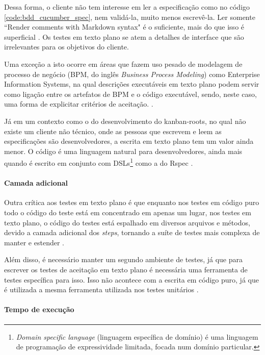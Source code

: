 Dessa forma, o cliente não tem interesse em ler a especificação como no código \ref{code:bdd_cucumber_spec}, nem validá-la, muito menos escrevê-la. Ler somente ``Render comments with Markdown syntax" é o suficiente, mais do que isso é superficial \cite{WhyBotherWithCucumberTesting}. Os testes em texto plano se atem a detalhes de interface que são irrelevantes para os objetivos do cliente.

Uma exceção a isto ocorre em áreas que fazem uso pesado de modelagem de processo de negócio (BPM, do inglês \textit{Business Process Modeling})  como Enterprise Information Systems, na qual descrições executáveis em texto plano podem servir como ligação entre os artefatos de BPM e o código executável, sendo, neste caso, uma forma de explicitar critérios de aceitação. \cite{IntroducingBLDD}.

Já em um contexto como o do desenvolvimento do kanban-roots, no qual não existe um cliente não técnico, onde as pessoas que escrevem e leem as especificações são desenvolvedores, a escrita em texto plano tem um valor ainda menor. O código é uma linguagem natural para desenvolvedores, ainda mais quando é escrito em conjunto com DSLs\footnote{\textit{Domain specific language} (linguagem específica de domínio) é uma linguagem de programação de expressividade limitada, focada num domínio particular.}  como a do Rspec \cite{SteakOverCucumber}.


\paragraph{Camada adicional}
\label{sssub:camada_adicional}

Outra crítica aos testes em texto plano é que enquanto nos testes em código puro todo o código do teste está em concentrado em apenas um lugar, nos testes em texto plano, o código do testes está espalhado em diversos arquivos e métodos, devido a camada adicional dos \textit{steps}, tornando a suíte de testes mais complexa de manter e estender \cite{SteakOverCucumber}.

Além disso, é necessário manter um segundo ambiente de testes, já que para escrever os testes de aceitação em texto plano é necessária uma ferramenta de testes específica para isso. Isso não acontece com a escrita em código puro, já que é utilizada a mesma ferramenta utilizada nos testes unitários \cite{WhyBotherWithCucumberTesting}.


\paragraph{Tempo de execução}
\label{sssub:tempo_de_execucao}

